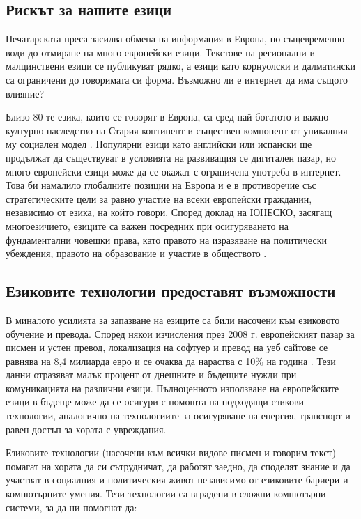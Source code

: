 \documentclass[]{../../metanetpaper}
\begin{document}
\begin{multicols}{2}
\subsection{Рискът за нашите езици}

Печатарската преса засилва обмена на информация в Европа, но същевременно води до отмиране на много европейски езици. Текстове на регионални и малцинствени езици се публикуват рядко, а  езици като корнуолски и далматински са ограничени до говоримата си форма. Възможно ли е интернет да има същото влияние?

Близо  80-те езика, които се говорят в Европа, са сред
 най-богатото и важно културно наследство на Стария континент и съществен  компонент от уникалния му социален модел  \cite{EC2}. Популярни езици като английски или испански ще продължат да съществуват в условията на развиващия се дигитален пазар, но много европейски езици може да се окажат
с ограничена употреба в интернет. Това би намалило глобалните позиции на Европа и е в противоречие със стратегическите цели за равно участие на всеки европейски
 гражданин, независимо от езика, на който говори. Според доклад на ЮНЕСКО, засягащ многоезичието,  езиците са важен посредник при осигуряването на
фундаментални  човешки права, като правото
 на изразяване на политически убеждения, правото на образование и участие в обществото \cite{Unesco1}.


\subsection{Езиковите технологии предоставят възможности}

В миналото усилията за запазване на езиците са били насочени
 към езиковото обучение и превода. Според някои
 изчисления през 2008 г. европейският пазар за писмен и
 устен превод, локализация на софтуер и превод на
 уеб сайтове се равнява на 8,4 милиарда евро и се
 очаква да нараства с 10\% на година \cite{EC3}. Тези данни отразяват малък процент от днешните и бъдещите нужди при комуникацията на различни езици.
Пълноценното използване на европейските езици в бъдеще може да се осигури с помощта на подходящи езикови технологии, аналогично на технологиите за осигуряване  на енергия, транспорт и равен достъп за хората с увреждания.  

Езиковите технологии (насочени към всички видове писмен и говорим текст) помагат на хората да си сътрудничат, да работят заедно, да споделят знание и да участват в социалния и
 политическия живот независимо от езиковите бариери и компютърните умения. Тези технологии са вградени в сложни компютърни системи, за да ни помогнат да:
\columnbreak


\end{multicols}
\end{document}
